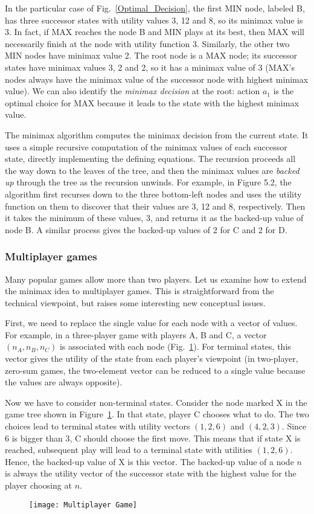 In the particular case of Fig.~\ref{Optimal_Decision}, the first MIN node, labeled B, has three successor states with utility values 3, 12 and 8, so its minimax value is 3. In fact, if MAX reaches the node B and MIN plays at its best, then MAX will necessarily finish at the node with utility function 3. Similarly, the other two MIN nodes have minimax value 2. The root node is a MAX node; its successor states have minimax values 3, 2 and 2, so it has a minimax value of 3 (MAX's nodes always have the minimax value of the successor node with highest minimax value). We can also identify the \emph{minimax decision} at the root: action $a_1$ is the optimal choice for MAX because it leads to the state with the highest minimax value.

The minimax algorithm computes the minimax decision from the current state. It uses a simple recursive computation of the minimax values of each successor state, directly implementing the defining equations. The recursion proceeds all the way down to the leaves of the tree, and then the minimax values are \emph{backed up} through the tree as the recursion unwinds. For example, in Figure 5.2, the algorithm first recurses down to the three bottom-left nodes and uses the utility function on them to discover that their values are 3, 12 and 8, respectively. Then it takes the minimum of these values, 3, and returns it as the backed-up value of node B. A similar process gives the backed-up values of 2 for C and 2 for D.
\subsubsection{Multiplayer games}
Many popular games allow more than two players. Let us examine how to extend the minimax idea to multiplayer games. This is straightforward from the technical viewpoint, but raises some interesting new conceptual issues.

First, we need to replace the single value for each node with a vector of values. For example, in a three-player game with players A, B and C, a vector $(n_A,n_B,n_C)$ is associated with each node (Fig.~\ref{Multiplayer_Game}). For terminal states, this vector gives the utility of the state from each player's viewpoint (in two-player, zero-sum games, the two-element vector can be reduced to a single value because the values are always opposite).

Now we have to consider non-terminal states. Consider the node marked X in the game tree shown in Figure~\ref{Multiplayer_Game}. In that state, player C chooses what to do. The two choices lead to terminal states with utility vectors $(1,2,6)$ and $(4,2,3)$. Since 6 is bigger than 3, C should choose the first move. This means that if state X is reached, subsequent play will lead to a terminal state with utilities $(1,2,6)$. Hence, the backed-up value of X is this vector. The backed-up value of a node $n$ is always the utility vector of the successor state with the highest value for the player choosing at $n$.
\begin{figure}[h!t]
\centering
\texttt{[image: Multiplayer Game]}
\caption{}\label{Multiplayer_Game}
\end{figure}

